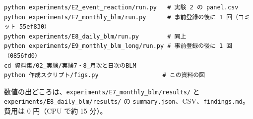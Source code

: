 \documentclass[xelatex,ja=standard,jafont=haranoaji,a4paper,10pt,openany]{bxjsreport}
\newcommand{\code}[1]{\texttt{#1}}
\begin{document}
\begin{verbatim}
python experiments/E2_event_reaction/run.py   # 実験 2 の panel.csv
python experiments/E7_monthly_blm/run.py      # 事前登録の後に 1 回（コミット 55ef830）
python experiments/E8_daily_blm/run.py        # 同上
python experiments/E9_monthly_blm_long/run.py # 事前登録の後に 1 回（0856fd0）
cd 資料集/02_実験/実験7・8_月次と日次のBLM
python 作成スクリプト/figs.py                  # この資料の図
\end{verbatim}

数値の出どころは、\code{experiments/E7\_monthly\_blm/results/} と \code{experiments/E8\_daily\_blm/results/} の \code{summary.json}、CSV、\code{findings.md}。費用は 0 円（CPU で約 15 分）。
\end{document}
